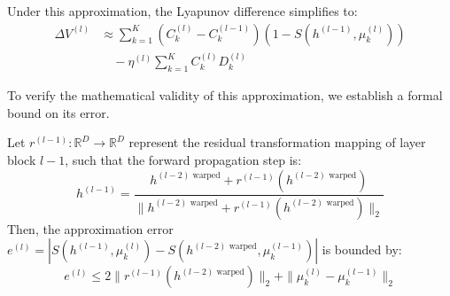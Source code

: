 Under this approximation, the Lyapunov difference simplifies to:
\begin{align}
\Delta V^{(l)} &\approx \sum_{k=1}^K \left( C_k^{(l)} - C_k^{(l-1)} \right) \left( 1 - S(h^{(l-1)}, \mu_k^{(l)}) \right) \nonumber \\
&\quad - \eta^{(l)} \sum_{k=1}^K C_k^{(l)} D_k^{(l)}
\label{eq:lyapunov_diff_expanded}
\end{align}

To verify the mathematical validity of this approximation, we establish a formal bound on its error.

\begin{theorem}
Let $r^{(l-1)}: \mathbb{R}^D \to \mathbb{R}^D$ represent the residual transformation mapping of layer block $l-1$, such that the forward propagation step is:
\begin{equation}
h^{(l-1)} = \frac{h^{(l-2) \text{ warped}} + r^{(l-1)}(h^{(l-2) \text{ warped}})}{\| h^{(l-2) \text{ warped}} + r^{(l-1)}(h^{(l-2) \text{ warped}}) \|_2}
\label{eq:forward_residual}
\end{equation}
Then, the approximation error $e^{(l)} = \left| S(h^{(l-1)}, \mu_k^{(l)}) - S(h^{(l-2) \text{ warped}}, \mu_k^{(l-1)}) \right|$ is bounded by:
\begin{equation}
e^{(l)} \le 2 \| r^{(l-1)}(h^{(l-2) \text{ warped}}) \|_2 + \| \mu_k^{(l)} - \mu_k^{(l-1)} \|_2
\label{eq:identity_bound}
\end{equation}
\end{theorem}


